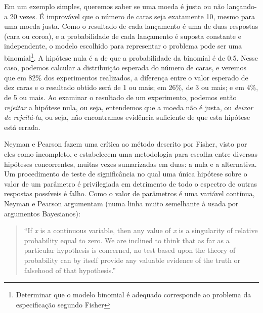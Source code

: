 Em um exemplo simples, queremos saber se uma moeda é justa ou não lançando-a 20 vezes. É improvável que o número de caras seja
exatamente 10, mesmo para uma moeda justa. Como o resultado de cada lançamento é uma de duas respostas (cara ou coroa), 
e a probabilidade de cada lançamento é suposta constante e independente, o modelo escolhido para representar o problema
pode ser uma binomial\footnote{Determinar que o modelo binomial é adequado corresponde ao problema da especificação
segundo Fisher}.
A hipótese nula é a de que a probabilidade da binomial é de 0.5. Nesse caso, podemos calcular a 
distribuição esperada do número de caras, e veremos que em 82\% dos experimentos realizados, a diferença entre o valor esperado
de dez caras e o resultado obtido será de 1 ou mais; em 26\%, de 3 ou mais; e em 4\%, de 5 ou mais. Ao examinar o resultado 
de um experimento, podemos então {\em rejeitar} a hipótese nula, ou seja, entendemos que a moeda não é justa, ou {\em deixar
de rejeitá-la}, ou seja, não encontramos evidência suficiente de que esta hipótese está errada.

Neyman e Pearson fazem uma crítica ao método descrito por Fisher, visto por eles como incompleto, e estabelecem uma metodologia
para escolha entre diversas hipóteses concorrentes, muitas vezes sumarizadas em duas: a nula e a alternativa.
Um procedimento de teste de significância
no qual uma única hipótese sobre o valor de um parâmetro é privilegiada em detrimento de todo o espectro de outras respostas
possíveis é falho. Como o valor de parâmetros é uma variável contínua, Neyman e Pearson argumentam (numa linha muito semelhante
à usada por argumentos Bayesianos):

\begin{quote}
``If {\em x} is a continuous variable, then any value of {\em x} is a singularity of relative probability equal to zero. We are
inclined to think that as far as a particular hypothesis is concerned, no test based upon the theory of probability can by
itself provide any valuable evidence of the truth or falsehood of that hypothesis.'' \citep{Neyman1933}
\end{quote}



